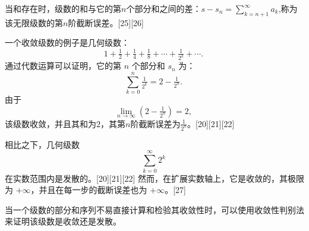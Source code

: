 当和存在时，级数的和与它的第$n$个部分和之间的差：$s - s_{n} = \sum_{k=n+1}^{\infty} a_{k}$,称为该无限级数的第$n$阶截断误差。[25][26]

一个收敛级数的例子是几何级数：
$$
1 + \tfrac{1}{2} + \tfrac{1}{4} + \tfrac{1}{8} + \cdots + \tfrac{1}{2^{k}} + \cdots .~
$$
通过代数运算可以证明，它的第 $n$ 个部分和 $s_{n}$ 为：
$$
\sum_{k=0}^{n} \tfrac{1}{2^{k}} = 2 - \tfrac{1}{2^{n}} .~
$$
由于
$$
\lim_{n \to \infty} \left( 2 - \tfrac{1}{2^{n}} \right) = 2 ,~
$$
该级数收敛，并且其和为$2$，其第$n$阶截断误差为$\tfrac{1}{2^{n}}$。[20][21][22]

相比之下，几何级数
$$
\sum_{k=0}^{\infty} 2^{k}~
$$
在实数范围内是发散的。[20][21][22] 然而，在扩展实数轴上，它是收敛的，其极限为 $+\infty$，并且在每一步的截断误差也为 $+\infty$。[27]

当一个级数的部分和序列不易直接计算和检验其收敛性时，可以使用收敛性判别法来证明该级数是收敛还是发散。
